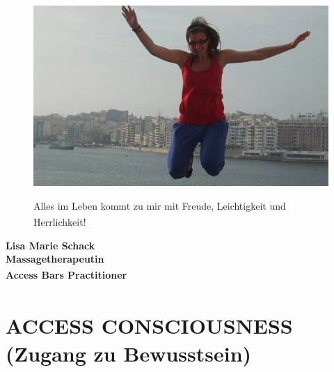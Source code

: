 \documentclass[10pt,foldmark,notumble]{leaflet}
\begin{document}
\vspace*{25mm}
\begin{figure}[h] %
\begin{center}
 
 \includegraphics [scale=.30]{Lisa_Sprung_neu.JPG}
 
 \large  Alles im Leben kommt zu mir mit Freude, Leichtigkeit und Herrlichkeit!\textsuperscript{\textregistered} %
 \end{center}
\end{figure}
\vspace*{1.5mm}
\begin{center}
{\LARGE \bf {Lisa Marie Schack}}\\
\vspace*{1mm}
\large \bf {Massagetherapeutin} \\ 
\vspace*{1mm}
\large {\bf {Access Bars Practitioner} \textsuperscript{\textregistered}} \\

\end{center}


\newpage

\section{ACCESS CONSCIOUSNESS \textsuperscript{\textregistered}\\
(Zugang zu Bewusstsein)}
\end{document}
